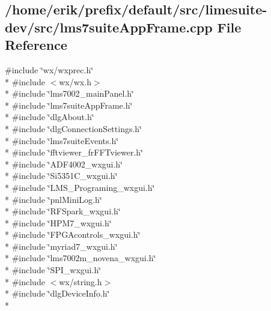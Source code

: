 \subsection{/home/erik/prefix/default/src/limesuite-\/dev/src/lms7suite\+App\+Frame.cpp File Reference}
\label{lms7suiteAppFrame_8cpp}
{\ttfamily \#include \char`\"{}wx/wxprec.\+h\char`\"{}}\\*
{\ttfamily \#include $<$wx/wx.\+h$>$}\\*
{\ttfamily \#include \char`\"{}lms7002\+\_\+main\+Panel.\+h\char`\"{}}\\*
{\ttfamily \#include \char`\"{}lms7suite\+App\+Frame.\+h\char`\"{}}\\*
{\ttfamily \#include \char`\"{}dlg\+About.\+h\char`\"{}}\\*
{\ttfamily \#include \char`\"{}dlg\+Connection\+Settings.\+h\char`\"{}}\\*
{\ttfamily \#include \char`\"{}lms7suite\+Events.\+h\char`\"{}}\\*
{\ttfamily \#include \char`\"{}fftviewer\+\_\+fr\+F\+F\+Tviewer.\+h\char`\"{}}\\*
{\ttfamily \#include \char`\"{}A\+D\+F4002\+\_\+wxgui.\+h\char`\"{}}\\*
{\ttfamily \#include \char`\"{}Si5351\+C\+\_\+wxgui.\+h\char`\"{}}\\*
{\ttfamily \#include \char`\"{}L\+M\+S\+\_\+\+Programing\+\_\+wxgui.\+h\char`\"{}}\\*
{\ttfamily \#include \char`\"{}pnl\+Mini\+Log.\+h\char`\"{}}\\*
{\ttfamily \#include \char`\"{}R\+F\+Spark\+\_\+wxgui.\+h\char`\"{}}\\*
{\ttfamily \#include \char`\"{}H\+P\+M7\+\_\+wxgui.\+h\char`\"{}}\\*
{\ttfamily \#include \char`\"{}F\+P\+G\+Acontrols\+\_\+wxgui.\+h\char`\"{}}\\*
{\ttfamily \#include \char`\"{}myriad7\+\_\+wxgui.\+h\char`\"{}}\\*
{\ttfamily \#include \char`\"{}lms7002m\+\_\+novena\+\_\+wxgui.\+h\char`\"{}}\\*
{\ttfamily \#include \char`\"{}S\+P\+I\+\_\+wxgui.\+h\char`\"{}}\\*
{\ttfamily \#include $<$wx/string.\+h$>$}\\*
{\ttfamily \#include \char`\"{}dlg\+Device\+Info.\+h\char`\"{}}\\*
